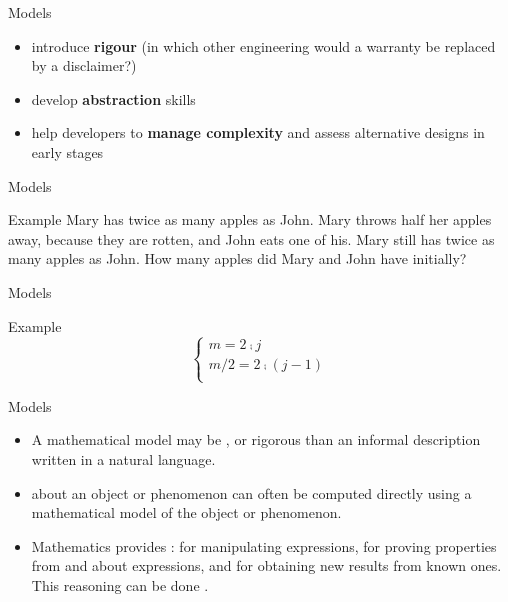 \documentclass{beamer}
\begin{document}
\begin{slide}{Models}
\begin{itemize}
\item introduce \textbf{rigour} (in which other engineering would a warranty be replaced by a disclaimer?)
\item develop \textbf{abstraction} skills
\item help developers to \textbf{manage complexity} and assess alternative designs in early stages
\end{itemize}
\begin{flushright}
\end{flushright}
\end{slide}


\begin{slide}{Models}
\begin{block}{Example}
Mary has twice as many apples as John. Mary throws half her apples away, because they are rotten, and John eats one of his. Mary still has twice as many apples as John. How many apples did Mary and John have initially?
\end{block}
\end{slide}

\begin{slide}{Models}
\begin{block}{Example}
\begin{equation*}
\left\{
  \begin{array}{l}
    m  =   2 \comp j \\
    m/2  =  2 \comp (j-1) \\
  \end{array}
\right.
\end{equation*}
\end{block}
\end{slide}


\begin{slide}{Models}
\begin{itemize}
\item 
A mathematical model may be , or rigorous than an informal description written in a natural language.
\item
{} about an object or phenomenon can often be computed directly using a mathematical model of the object or phenomenon.
\item
Mathematics provides : for manipulating expressions, for proving properties from and about expressions, and for obtaining new results from known ones. This reasoning can be done .
\end{itemize}
\end{slide}
\end{document}
